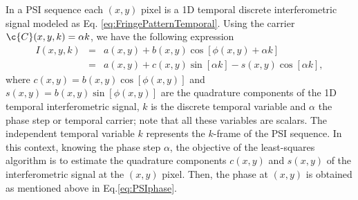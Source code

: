 In a PSI sequence each $(x,y)$ pixel is a 1D temporal discrete interferometric 
signal modeled as Eq. \eqref{eq:FringePatternTemporal}. Using the carrier 
$\c{C}(x,y,k)=\alpha k$, we have the following expression
\begin{eqnarray}
  I(x,y,k) &=& a(x,y) + b(x,y)\cos[\phi(x,y) +\alpha k] \nonumber \\
  &=& a(x,y) + c(x,y)\sin[\alpha k] - s(x,y)\cos[\alpha k],
  \label{eq:PSI_Sequence}
\end{eqnarray}
where $c(x,y)=b(x,y)\cos[\phi(x,y)]$ and
$s(x,y)=b(x,y)\sin[\phi(x,y)]$ are the quadrature components of the
1D temporal interferometric signal, $k$ is the discrete temporal
variable and $\alpha$ the phase step or temporal carrier; note that
all these variables are scalars. The independent temporal variable $k$
represents the $k$-frame of the PSI sequence. In this context, knowing
the phase step $\alpha$, the objective of the least-squares algorithm is to 
estimate the quadrature components $c(x,y)$ and $s(x,y)$ of the interferometric
signal at the $(x,y)$ pixel. Then, the phase at $(x,y)$ is obtained as 
mentioned above in Eq.\eqref{eq:PSIphase}.

